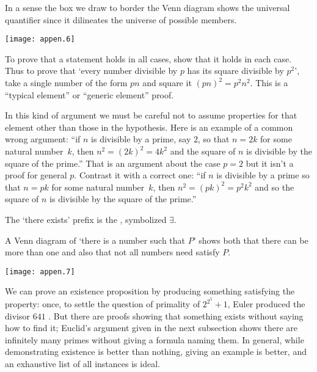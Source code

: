 In a sense the
box we draw to border the Venn diagram shows the universal quantifier since
it dilineates the universe of possible members.
\begin{center}
  \texttt{[image: appen.6]}
\end{center}

To prove that a statement holds in all cases, 
show that it holds in each case.
Thus to prove that `every number divisible by \( p \) has its
square divisible by \( p^2 \)', take a single number of the form
\( pn \) and square it \( (pn)^2=p^2n^2 \).
This is a ``typical element'' or ``generic element'' proof.

In this kind of argument we must be careful not to assume 
properties for that element
other than those in the hypothesis.
Here is an example of a common wrong argument:
``if \( n \) is divisible by a prime, say \( 2 \), so that \( n=2k \)
for some natural number~$k$,
then \( n^2=(2k)^2=4k^2 \) and the square of $n$ is divisible
by the square of the prime.''
That is an argument about the case \( p=2 \) but it isn't a proof for
general \( p \).
Contrast it with a correct one:
``if \( n \) is divisible by a prime
so that \( n=pk \) for some natural number~$k$,
then \( n^2=(pk)^2=p^2k^2 \) and so the square of $n$ is divisible
by the square of the prime.''




The `there exists' prefix is the 
,
symbolized 
\( \exists \).


A Venn diagram 
of `there is a number such that \( P \)' shows both that there can be
more than one and also that not all numbers need satisfy \( P \).
\begin{center}
  \texttt{[image: appen.7]}
\end{center}

We can prove
an existence proposition by producing something satisfying
the property: once, to settle the question of primality of
\( 2^{2^5}+1 \), Euler produced the divisor \( 641 \) \cite{Sandifer}.
But there are proofs
showing that something exists without saying how to find it;
Euclid's argument given in the next subsection
shows there are infinitely many primes without giving a formula naming them.
In general, while demonstrating existence is better than nothing,
giving an example is better, and an
exhaustive list of all instances is ideal.

